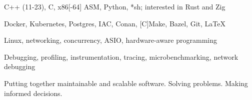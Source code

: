

\begin{cventries}
    \begin{cvitems} %
      \item{C++ (11-23), C, x86[-64] ASM, Python, *sh; interested in Rust and Zig}
      \item{Docker, Kubernetes, Postgres, IAC, Conan, [C]Make, Bazel, Git, \LaTeX}
      \item{Linux, networking, concurrency, ASIO, hardware-aware programming}
      \item{Debugging, profiling, instrumentation, tracing, microbenchmarking, network debugging}
      \item{Putting together maintainable and scalable software. Solving problems. Making informed decisions.}
    \end{cvitems}

  \bigskip
\end{cventries}
